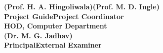 \begin{spacing}{0}
\vspace{3.0cm}
\large{\textbf{(Prof. H. A. Hingoliwala)}}\hspace*{2.2in}\large{\textbf{(Prof. M. D. Ingle)}}\\
\hspace*{0.7in}\textbf{Project Guide}\hspace*{2.6in}\textbf{Project Coordinator}\\
\hspace*{0.1cm}\textbf{HOD, Computer Department}\\[3cm]
\hspace*{0.5in}\large{\textbf{(Dr. M. G. Jadhav)}}\\
\hspace*{0.9in}\textbf{Principal}\hspace*{2.8in}\textbf{External Examiner}
\end{spacing}
